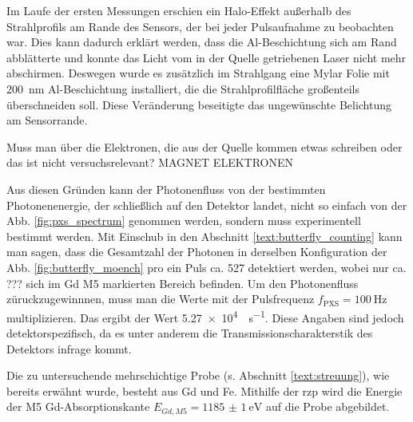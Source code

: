 \noindent
Im Laufe der ersten Messungen erschien ein Halo-Effekt außerhalb des Strahlprofils am Rande des Sensors, der bei jeder Pulsaufnahme zu beobachten war. Dies kann dadurch erklärt werden, dass die Al-Beschichtung sich am Rand abblätterte und konnte das Licht vom in der Quelle getriebenen Laser nicht mehr abschirmen. Deswegen wurde es zusätzlich im Strahlgang eine Mylar Folie mit \SI{200}{\nano\meter} Al-Beschichtung installiert, die die Strahlprofilfläche großenteils überschneiden soll. Diese Veränderung beseitigte das ungewünschte Belichtung am Sensorrande.

\noindent
Muss man über die Elektronen, die aus der Quelle kommen etwas schreiben oder das ist nicht versuchsrelevant? MAGNET ELEKTRONEN

\noindent
Aus diesen Gründen kann der Photonenfluss von der bestimmten Photonenenergie, der schließlich auf den Detektor landet, nicht so einfach von der Abb. \ref{fig:pxs_spectrum} genommen werden, sondern muss experimentell bestimmt werden. Mit Einschub in den Abschnitt \ref{text:butterfly_counting} kann man sagen, dass die Gesamtzahl der Photonen in derselben Konfiguration der Abb. \ref{fig:butterfly_moench} pro ein Puls ca. 527 detektiert werden, wobei nur ca. ??? sich im Gd M5 markierten Bereich befinden. Um den Photonenfluss züruckzugewinnnen, muss man die Werte mit der Pulsfrequenz $f_\text{PXS} = \SI{100}{\hertz}$ multiplizieren. Das ergibt der Wert \SI{5.27e4}{\photons\per\second}.  Diese Angaben sind jedoch detektorspezifisch, da es unter anderem die Transmissionscharakterstik des Detektors infrage kommt.


\noindent
Die zu untersuchende mehrschichtige Probe (s. Abschnitt \ref{text:streuung}), wie bereits erwähnt wurde, besteht aus Gd und Fe. Mithilfe der \gls{rzp} wird die Energie der M5 Gd-Absorptionskante $E_{Gd, M5} = \SI{1185(1)}{\eV}$ \cite[Abb. 6(a)]{prieto_x-ray_2005} auf die Probe abgebildet.